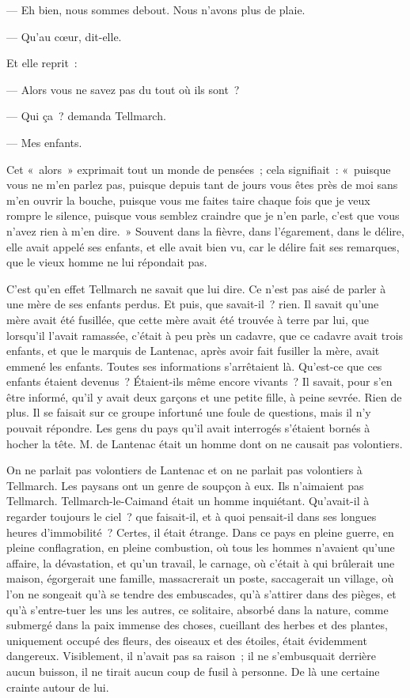 \documentclass[french,twoside]{book} %
\begin{document}
— Eh bien, nous sommes debout. Nous n’avons plus de plaie.\par
— Qu’au cœur, dit-elle.\par
Et elle reprit :\par
— Alors vous ne savez pas du tout où ils sont ?\par
— Qui ça ? demanda Tellmarch.\par
— Mes enfants.\par
Cet « alors » exprimait tout un monde de pensées ; cela signifiait : « puisque vous ne m’en parlez pas, puisque depuis tant de jours vous êtes près de moi sans m’en ouvrir la bouche, puisque vous me faites taire chaque fois que je veux rompre le silence, puisque vous semblez craindre que je n’en parle, c’est que vous n’avez rien à m’en dire. » Souvent dans la fièvre, dans l’égarement, dans le délire, elle avait appelé ses enfants, et elle avait bien vu, car le délire fait ses remarques, que le vieux homme ne lui répondait pas.\par
 C’est qu’en effet Tellmarch ne savait que lui dire. Ce n’est pas aisé de parler à une mère de ses enfants perdus. Et puis, que savait-il ? rien. Il savait qu’une mère avait été fusillée, que cette mère avait été trouvée à terre par lui, que lorsqu’il l’avait ramassée, c’était à peu près un cadavre, que ce cadavre avait trois enfants, et que le marquis de Lantenac, après avoir fait fusiller la mère, avait emmené les enfants. Toutes ses informations s’arrêtaient là. Qu’est-ce que ces enfants étaient devenus ? Étaient-ils même encore vivants ? Il savait, pour s’en être informé, qu’il y avait deux garçons et une petite fille, à peine sevrée. Rien de plus. Il se faisait sur ce groupe infortuné une foule de questions, mais il n’y pouvait répondre. Les gens du pays qu’il avait interrogés s’étaient bornés à hocher la tête. M. de Lantenac était un homme dont on ne causait pas volontiers.\par
On ne parlait pas volontiers de Lantenac et on ne parlait pas volontiers à Tellmarch. Les paysans ont un genre de soupçon à eux. Ils n’aimaient pas Tellmarch. Tellmarch-le-Caimand était un homme inquiétant. Qu’avait-il à regarder toujours le ciel ? que faisait-il, et à quoi pensait-il dans ses longues heures d’immobilité ? Certes, il était étrange. Dans ce pays en pleine guerre, en pleine conflagration, en pleine combustion, où tous les hommes n’avaient qu’une affaire, la dévastation, et qu’un travail, le carnage, où c’était à qui brûlerait une maison, égorgerait une famille, massacrerait un poste, saccagerait un village, où l’on ne songeait qu’à se tendre des embuscades, qu’à s’attirer  dans des pièges, et qu’à s’entre-tuer les uns les autres, ce solitaire, absorbé dans la nature, comme submergé dans la paix immense des choses, cueillant des herbes et des plantes, uniquement occupé des fleurs, des oiseaux et des étoiles, était évidemment dangereux. Visiblement, il n’avait pas sa raison ; il ne s’embusquait derrière aucun buisson, il ne tirait aucun coup de fusil à personne. De là une certaine crainte autour de lui.\par
\end{document}

